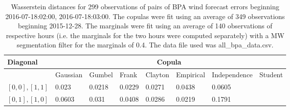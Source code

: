 \begin{table}[h] 
    \centering 
    \begin{tabular}{|l|l|l|l|l|l|l|l|} \hline 
        \textbf{Diagonal} & \multicolumn{7}{c|}{\textbf{Copula}} \\ \hline 
        & Gaussian & Gumbel & Frank & Clayton & Empirical & Independence & Student \\ \hline 
        $[0,0], [1,1]$ & 0.023 & 0.0218 & 0.0229 & 0.0271 & 0.0438 & 0.0605 &  \\ \hline 
        $[0,1], [1,0]$ & 0.0603 & 0.031 & 0.0408 & 0.0286 & 0.0219 & 0.1791 &  \\ \hline 
    \end{tabular} 
    \caption{Wasserstein distances for 299 observations of pairs of BPA wind forecast errors beginning 2016-07-18:02:00, 2016-07-18:03:00. The copulas were fit  using an average of 349 observations beginning 2015-12-28. The marginals were fit using an average of 140 observations of respective hours (i.e. the  marginals for the two hours were computed separately) with a MW segmentation filter for the marginals of 0.4. The data file used was all\_bpa\_data.csv.} 
\end{table}